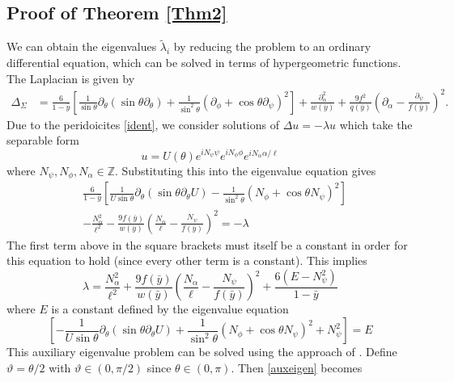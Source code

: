 \documentclass[11pt]{amsart}
\theoremstyle{plain}
\theoremstyle{definition}
\numberwithin{equation}{section}
\begin{document}
\subsection{Proof of Theorem \ref{Thm2}} We can obtain the eigenvalues $\tilde\lambda_i$ by reducing the problem to an ordinary differential equation, which can be solved in terms of hypergeometric functions. The Laplacian is given by
\begin{equation}
    \begin{aligned}
        \Delta_\Sigma &= \frac{6}{1-\bar{y}} \left[ \frac{1}{\sin\theta} \partial_\theta (\sin\theta \partial_\theta) + \frac{1}{\sin^2\theta} \left(\partial_\phi + \cos\theta \partial_\psi\right)^2 \right] + \frac{\partial_\alpha^2}{w(\bar{y})} + \frac{9 f^2}{q(\bar{y})} \left(\partial_\alpha - \frac{\partial_\psi}{f(\bar{y})}\right)^2.
    \end{aligned}
\end{equation}  Due to the peridoicites \eqref{ident}, we consider solutions of $\Delta u = -\lambda u$ which take the separable form
\begin{equation}
    u = U(\theta) e^{ i N_\psi \psi} e^{i N_\phi \phi} e^{i N_\alpha \alpha / \ell}
\end{equation} where $N_\psi, N_\phi, N_\alpha \in \mathbb{Z}$. Substituting this into the eigenvalue equation gives
\begin{equation}
\begin{aligned}
    & \frac{6}{1-\bar{y}} \left[ \frac{1}{U \sin\theta} \partial_\theta ( \sin\theta \partial_\theta U) - \frac{1}{\sin^2\theta} (N_\phi + \cos\theta N_\psi)^2 \right] \\ & - \frac{N_\alpha^2}{\ell^2} - \frac{9f(\bar{y})}{w(\bar{y})}\left(\frac{N_\alpha}{\ell} - \frac{N_\psi}{f(\bar{y})}\right)^2 = -\lambda
    \end{aligned}
\end{equation} The first term above in the square brackets must itself be a constant in order for this equation to hold (since every other term is a constant). This implies
\begin{equation}\label{eigen:Lap}
    \lambda = \frac{N_\alpha^2}{\ell^2} + \frac{9f(\bar{y})}{w(\bar{y})}\left(\frac{N_\alpha}{\ell} - \frac{N_\psi}{f(\bar{y})}\right)^2 + \frac{6(E - N_\psi^2)}{1-\bar{y}}
\end{equation} where $E$ is a constant defined by the eigenvalue equation
\begin{equation}\label{auxeigen}
    \left[ -\frac{1}{U \sin\theta} \partial_\theta ( \sin\theta \partial_\theta U) + \frac{1}{\sin^2\theta} (N_\phi + \cos\theta N_\psi)^2 + N_\psi^2\right] = E
\end{equation} This auxiliary eigenvalue problem can be solved using the approach of \cite{Gibbons:2004em}. Define $\vartheta = \theta/2$ with $\vartheta \in (0,\pi/2)$ since $\theta \in (0,\pi)$. Then \eqref{auxeigen} becomes
\end{document}
